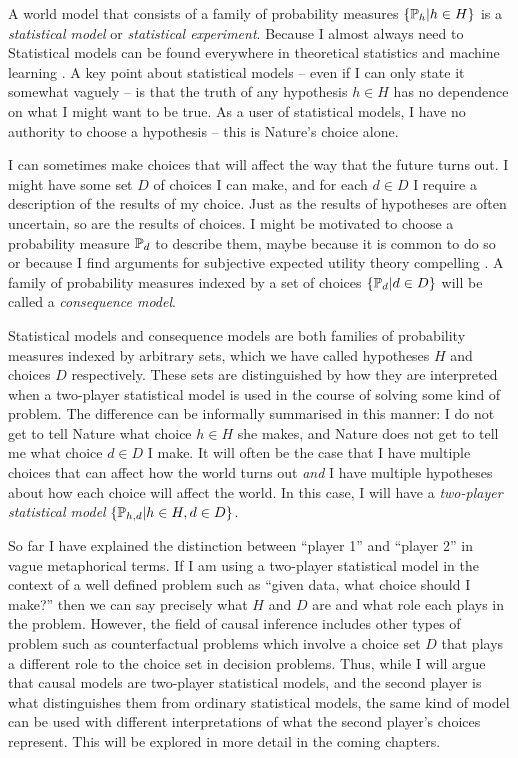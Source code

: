 A world model that consists of a family of probability measures $\{\mathbb{P}_h|h\in H\}$ is a \emph{statistical model} or \emph{statistical experiment}. Because I almost always need to Statistical models can be found everywhere in theoretical statistics and machine learning \cite{fisher_statistical_1992,le_cam_comparison_1996,freedman_asymptotic_1963,de_finetti_foresight_1992,vapnik_nature_2013,wald_statistical_1950}. A key point about statistical models -- even if I can only state it somewhat vaguely -- is that the truth of any hypothesis $h\in H$ has no dependence on what I might want to be true. As a user of statistical models, I have no authority to choose a hypothesis -- this is Nature's choice alone. 

I can sometimes make choices that will affect the way that the future turns out. I might have some set $D$ of choices I can make, and for each $d\in D$ I require a description of the results of my choice. Just as the results of hypotheses are often uncertain, so are the results of choices. I might be motivated to choose a probability measure $\mathbb{P}_d$ to describe them, maybe because it is common to do so or because I find arguments for subjective expected utility theory compelling \citep{steele_decision_2020}. A family of probability measures indexed by a set of choices $\{\mathbb{P}_d|d\in D\}$ will be called a \emph{consequence model}.

Statistical models and consequence models are both families of probability measures indexed by arbitrary sets, which we have called hypotheses $H$ and choices $D$ respectively. These sets are distinguished by how they are interpreted when a two-player statistical model is used in the course of solving some kind of problem. The difference can be informally summarised in this manner: I do not get to tell Nature what choice $h\in H$ she makes, and Nature does not get to tell me what choice $d\in D$ I make. It will often be the case that I have multiple choices that can affect how the world turns out \emph{and} I have multiple hypotheses about how each choice will affect the world. In this case, I will have a \emph{two-player statistical model} $\{\mathbb{P}_{h,d}|h\in H,d\in D\}$. 

So far I have explained the distinction between ``player 1'' and ``player 2'' in vague metaphorical terms. If I am using a two-player statistical model in the context of a well defined problem such as ``given data, what choice should I make?'' then we can say precisely what $H$ and $D$ are and what role each plays in the problem. However, the field of causal inference includes other types of problem such as counterfactual problems which involve a choice set $D$ that plays a different role to the choice set in decision problems. Thus, while I will argue that causal models are two-player statistical models, and the second player is what distinguishes them from ordinary statistical models, the same kind of model can be used with different interpretations of what the second player's choices represent. This will be explored in more detail in the coming chapters.

